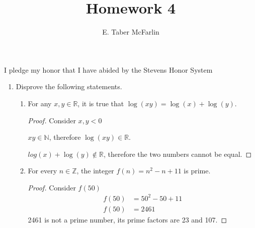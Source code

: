 \documentclass[12pt,a4paper,reqno,parskip=full]{amsart}
\numberwithin{equation}{section}
\theoremstyle{plain}
\theoremstyle{definition}
\begin{document}
\title{Homework 4}

\author{E. Taber McFarlin}

\maketitle

I pledge my honor that I have abided by the Stevens Honor System

\begin{enumerate}
  \item Disprove the following statements.
        \begin{enumerate}
          \item For any $x,y\in\mathbb{R}$, it is true that $\log(xy)=\log(x)+\log(y)$.
                \begin{proof} Consider $x,y<0$

                  $xy\in\mathbb{N}$, therefore $\log(xy)\in\mathbb{R}$.

                  $log(x) + \log(y)\notin\mathbb{R}$, therefore the two numbers cannot be equal.
                \end{proof}

          \item For every $n\in\mathbb{Z}$, the integer $f(n)=n^2-n+11$ is prime.
                \begin{proof} Consider $f(50)$
                  \begin{align*}
                    f(50) & = 50^2 - 50 + 11 \\
                    f(50) & = 2461
                  \end{align*}
                  2461 is not a prime number, its prime factors are 23 and 107.
                \end{proof}
        \end{enumerate}


\end{enumerate}
\end{document}

